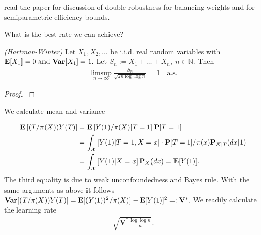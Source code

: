read the paper \cite{Zhao2017a} for discussion of double robustness for balancing weights and \cite{Hahn1998} for semiparametric efficiency bounds.


What is the best rate we can achieve?

\begin{theorem}
  \emph{(Hartman-Winter)}
  Let 
  $
    X_1,
    X_2,
    \ldots
  $
  be i.i.d. real random variables with 
  $
    \E[X_1]=0
    \ 
    \text{and}
    \ 
    \mathbf{Var}
    [X_1]
    = 1.
  $
  Let
  $
    S_n
    :=
    X_1
    +
    \ldots
    +
    X_n,
    \ 
    n\in \mathbb{N}
    .
  $
  Then
  \begin{gather}
    \limsup_{n\to\infty}
    \frac{S_n}{
      \sqrt{
        2n
        \log
        \log
        n
      }
    }
    =
    1
    \quad
    \text{a.s.}
  \end{gather}
\end{theorem}
\begin{proof}
  \cite[Theorem~22.11]{Klenke2020}
\end{proof}


We calculate mean and variance

\begin{align}
  \mathbf{E}
  \left[ 
    (T/\pi(X))
    Y(T)
  \right]
  &=
  \mathbf{E}
  \left[ 
    Y(1)
    /\pi(X)
    \vert
    T=1
  \right]
  \mathbf{P}[T=1]
  \\
  &=
  \int_\mathcal{X}
  \left[ 
    Y(1)
    \vert
    T=1,
    X=x
  \right]
  \cdot
  \mathbf{P}[T=1]
  /
  \pi(x)
  \mathbf{P}_{X|T}(dx|1)
  \\
  &=
  \int_\mathcal{X}
  \left[ 
    Y(1)
    \vert
    X=x
  \right]
  \mathbf{P}_X(dx)
  =
  \mathbf{E}[Y(1)]
  .
\end{align}
The third equality is due to weak unconfoundedness and Bayes rule.
With the same arguments as above it follows
$
  \mathbf{Var}
  [
    (T/\pi(X))
    Y(T)
  ]
    =
    \mathbf{E}[
    (Y(1))^2
    /
    \pi(X)
    ]
    -
    \mathbf{E}[Y(1)]^2
    =:
    \mathbf{V}^*
    .
$
We readily calculate the learning rate 
\begin{gather}
  \sqrt{
    \mathbf{V}^*
    \frac{\log\log n}{n}
  }
  .
\end{gather}
